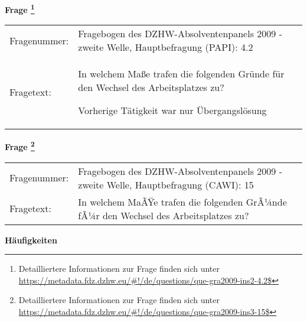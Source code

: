 				\vspace*{0.5cm}
                \noindent\textbf{Frage
	                \footnote{Detailliertere Informationen zur Frage finden sich unter
		              \url{https://metadata.fdz.dzhw.eu/\#!/de/questions/que-gra2009-ins2-4.2$}}}\\
				\begin{tabularx}{\hsize}{@{}lX}
					Fragenummer: &
					  Fragebogen des DZHW-Absolventenpanels 2009 - zweite Welle, Hauptbefragung (PAPI):
					  4.2
 \\
					Fragetext: & In welchem Maße trafen die folgenden Gründe für den Wechsel des Arbeitsplatzes zu?\par  Vorherige Tätigkeit war nur Übergangslösung \\
				\end{tabularx}
				\vspace*{0.5cm}
                \noindent\textbf{Frage
	                \footnote{Detailliertere Informationen zur Frage finden sich unter
		              \url{https://metadata.fdz.dzhw.eu/\#!/de/questions/que-gra2009-ins3-15$}}}\\
				\begin{tabularx}{\hsize}{@{}lX}
					Fragenummer: &
					  Fragebogen des DZHW-Absolventenpanels 2009 - zweite Welle, Hauptbefragung (CAWI):
					  15
 \\
					Fragetext: & In welchem MaÃŸe trafen die folgenden GrÃ¼nde fÃ¼r den Wechsel des Arbeitsplatzes zu? \\
				\end{tabularx}





        		\vspace*{0.5cm}
                \noindent\textbf{Häufigkeiten}

